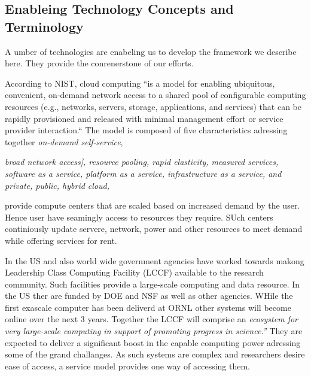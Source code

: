 

\subsection{Enableing Technology Concepts and Terminology}

A umber of technologies are enabeling us to develop the framework we
describe here. They provide the conrenerstone of our efforts.

\begin{description}

\item[Cloud]
     According to NIST, cloud computing ``is a model for enabling
     ubiquitous, convenient, on-demand network access to a shared pool
     of configurable computing resources (e.g., networks, servers,
     storage, applications, and services) that can be rapidly
     provisioned and released with minimal management effort or
     service provider interaction.`` The model is composed of five
     characteristics adressing together {\em on-demand self-service},
     {\em broad network access], {\em resource pooling}, {\em rapid
     elasticity}, {\em measured services}, {\em software as a
     service}, {\em platform as a service}, {\em infrastructure as a
     service}, and {\em private, public, hybrid cloud},

\item[Hyperscale cloud compute centers]
     provide compute centers that are scaled based on increased demand
     by the user. Hence user have seamingly access to resources they
     require. SUch centers continiously update servere, network, power
     and other resources to meet demand while offering services for
     rent.

\item[Leadership class computing facilities] 
     In the US and also world wide \cite{www-top500} government
     agencies have worked towards makong Leadership Class Computing
     Facility (LCCF) available to the research community. Such
     facilities provide a large-scale computing and data resource. In
     the US ther are funded by DOE and NSF as well as other
     agencies. WHile the first exascale computer has been deliverd at
     ORNL \cite{www-top500} other systems will become online over the
     next 3 years.  Together the LCCF will comprise an {\em ecosystem
     for very large-scale computing in support of promoting progress
     in science.''} They are expected to deliver a significant boost
     in the capable computing power adressing some of the grand
     challanges. As such systems are complex and researchers desire
     ease of access, a service model provides one way of accessing
     them.

}
\end{description}
